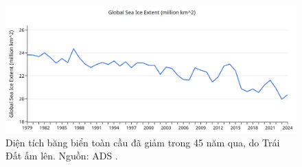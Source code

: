 \documentclass[10pt,twocolumn,letterpaper]{article}
\begin{document}
\begin{figure}[t]
\begin{center}
\includegraphics[width=1\textwidth]{ice.jpg}

\end{center}
   \caption{Diện tích băng biển toàn cầu đã giảm trong 45 năm qua, do Trái Đất ấm lên. Nguồn: ADS \cite{149}.}
\label{fig:24}
\end{figure}

\clearpage
\twocolumn

{\small
\renewcommand{\refname}{Tài liệu tham khảo}


}
\end{document}
